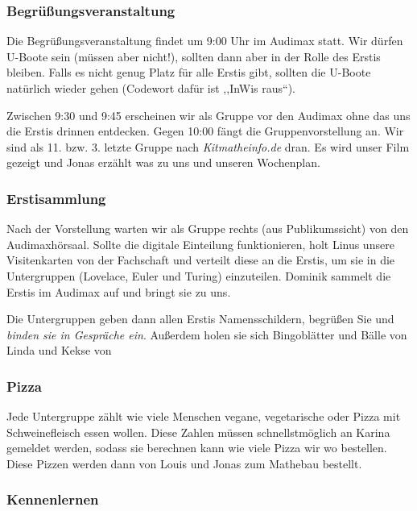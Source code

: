 \documentclass[10pt,ngerman]{scrartcl}
\begin{document}
\begin{multicols}{2}
\subsubsection{Begrüßungsveranstaltung}

Die Begrüßungsveranstaltung findet um 9:00 Uhr im Audimax statt. Wir
dürfen U-Boote sein (müssen aber nicht!), sollten dann aber in der
Rolle des Erstis bleiben. Falls es nicht genug Platz für alle Erstis
gibt, sollten die U-Boote natürlich wieder gehen (Codewort dafür ist
,,InWis raus``). 

Zwischen 9:30 und 9:45 erscheinen wir als Gruppe vor den Audimax ohne das uns
die Erstis drinnen entdecken. Gegen 10:00 fängt die Gruppenvorstellung an.  Wir
sind als 11. bzw. 3. letzte Gruppe nach \emph{Kitmatheinfo.de} dran. Es wird unser
Film gezeigt und Jonas erzählt was zu uns und unseren Wochenplan.

\subsubsection{Erstisammlung}

Nach der Vorstellung warten wir als Gruppe rechts (aus Publikumssicht) von den
Audimaxhörsaal. Sollte die digitale Einteilung funktionieren, holt Linus unsere
Visitenkarten von der Fachschaft und verteilt diese an die Erstis, um sie in
die Untergruppen (Lovelace, Euler und Turing) einzuteilen. Dominik sammelt die
Erstis im Audimax auf und bringt sie zu uns. 

Die Untergruppen geben dann allen Erstis Namensschildern, begrüßen Sie und
\emph{binden sie in Gespräche ein}. Außerdem holen sie sich Bingoblätter und Bälle von Linda und Kekse von 

\subsubsection{Pizza}

Jede Untergruppe zählt wie viele Menschen vegane, vegetarische oder Pizza mit
Schweinefleisch essen wollen. Diese Zahlen müssen schnellstmöglich an Karina
gemeldet werden, sodass sie berechnen kann wie viele Pizza wir wo bestellen.
Diese Pizzen werden dann von Louis und Jonas zum Mathebau bestellt.



\subsubsection{Kennenlernen}


\end{multicols}
\end{document}
